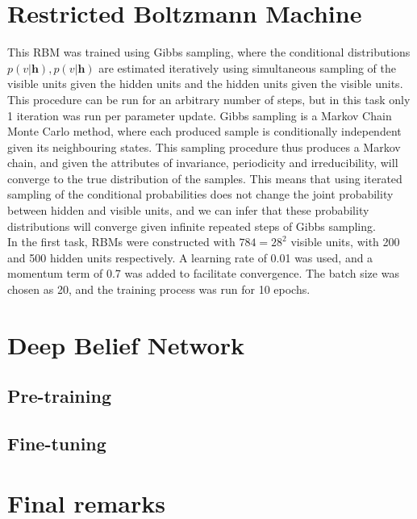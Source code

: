 \documentclass[a4paper]{article}
\begin{document}
\section{Restricted Boltzmann Machine}
This RBM was trained using Gibbs sampling, where the conditional distributions $p(v\vert\mathbf{h}), p(v\vert\mathbf{h})$ are estimated iteratively using simultaneous sampling of the visible units given the hidden units and the hidden units given the visible units. This procedure can be run for an arbitrary number of steps, but in this task only 1 iteration was run per parameter update. Gibbs sampling is a Markov Chain Monte Carlo method, where each produced sample is conditionally independent given its neighbouring states. This sampling procedure thus produces a Markov chain, and given the attributes of invariance, periodicity and irreducibility, will converge to the true distribution of the samples. This means that using iterated sampling of the conditional probabilities does not change the joint probability between hidden and visible units, and we can infer that these probability distributions will converge given infinite repeated steps of Gibbs sampling. \\
In the first task, RBMs were constructed with $784 = 28^2$ visible units, with 200 and 500 hidden units respectively. A learning rate of 0.01 was used, and a momentum term of 0.7 was added to facilitate convergence. The batch size was chosen as 20, and the training process was run for 10 epochs.
\section{Deep Belief Network}

\subsection{Pre-training}

\subsection{Fine-tuning}

\section{Final remarks}
\end{document}
